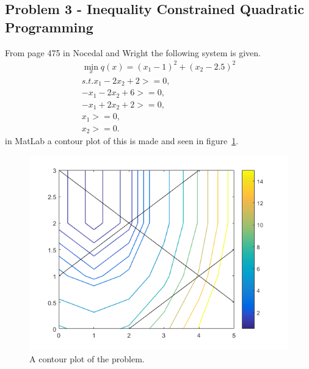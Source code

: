 \subsection{Problem 3 - Inequality Constrained Quadratic Programming}
From page 475 in Nocedal and Wright the following system is given.
\begin{equation}
\begin{split}
\min_{x} q(x) = (x_1-1)^2+(x_2-2.5)^2 \\
s.t. x_1-2x_2+2> = 0,\\
-x_1-2x_2+6>=0,\\
-x_1+2x_2+2>=0,\\
x_1>=0,\\
x_2>=0.
\end{split}
\end{equation}
in MatLab a contour plot of this is made and seen in figure~\ref{fig:exe3_contour_plot}.
\begin{figure}[h!]
	\centering
		\includegraphics{exe3_contour_plot.png}
	\caption{A contour plot of the problem.}
	\label{fig:exe3_contour_plot}
\end{figure}



